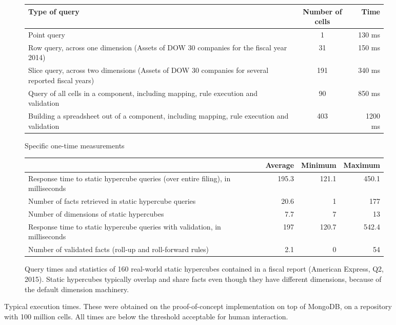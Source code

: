 \documentclass{acm_proc_article-sp}
\begin{document}
\begin{figure*}

\begin{subfigure}[c]{\linewidth}
\centering
\begin{tabular}{lcr}
\hline
\hline
Type of query & Number of cells & Time \\
\hline
\hline
Point query & 1 & 130 ms \\
\hline
Row query, across one dimension (Assets of DOW 30 companies for the fiscal year 2014)&31& 150 ms \\
\hline
Slice query, across two dimensions (Assets of DOW 30 companies for several reported fiscal years)&191& 340 ms \\
\hline
Query of all cells in a component, including mapping, rule execution and validation& 90& 850 ms \\
\hline
Building a spreadsheet out of a component, including mapping, rule execution and validation & 403 & 1200 ms \\
\hline
\end{tabular}
\caption{Specific one-time measurements}
\end{subfigure}

\begin{subfigure}[c]{\linewidth}
\centering
\begin{tabular}{lrrr}
\hline
\hline
&Average & Minimum &Maximum\\
\hline
Response time to static hypercube queries (over entire filing), in milliseconds&195.3&121.1&450.1\\
Number of facts retrieved in static hypercube queries&20.6&1&177\\
Number of dimensions of static hypercubes&7.7&7&13\\
Response time to static hypercube queries with validation, in milliseconds&197&120.7&542.4\\
Number of validated facts (roll-up and roll-forward rules)&2.1&0&54\\
\hline
\end{tabular}
\caption{Query times and statistics of 160 real-world static hypercubes contained in a fiscal report (American Express, Q2, 2015). Static hypercubes typically overlap and share facts even though they have different dimensions, because of the default dimension machinery.}
\end{subfigure}

\vspace{3mm}
\caption{Typical execution times. These were obtained on the proof-of-concept implementation on top of MongoDB, on a repository with 100 million cells. All times are below the threshold acceptable for human interaction.}
\label{fig-measurements}
\end{figure*}
\end{document}
